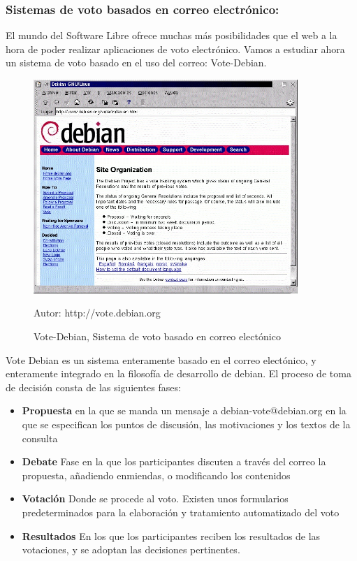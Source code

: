 \subsubsection*{Sistemas de voto basados en correo electrónico:}
El mundo del Software Libre ofrece muchas más posibilidades que el web a la hora de poder realizar aplicaciones de voto electrónico. Vamos a estudiar ahora un sistema de voto basado en el uso del correo: Vote-Debian.

\begin{figure}[H]
\centering
\includegraphics[width=10cm]{Figuras/debian.jpg}
\caption{Vote-Debian, Sistema de voto basado en correo electónico}
Autor:  http://vote.debian.org
\end{figure}

Vote Debian es un sistema enteramente basado en el correo electónico, y enteramente integrado en la filosofía de desarrollo de debian. El proceso de toma de decisión consta de las siguientes fases:

\begin{itemize}
\item \textbf{Propuesta }en la que se manda un mensaje a debian-vote@debian.org en la que se especifican los puntos de discusión, las motivaciones y los textos de la consulta
\item \textbf{Debate} Fase en la que los participantes discuten a través del correo la propuesta, añadiendo enmiendas, o modificando los contenidos
\item \textbf{Votación} Donde se procede al voto. Existen unos formularios predeterminados para la elaboración y tratamiento automatizado del voto
\item \textbf{Resultados} En los que los participantes reciben los resultados de las votaciones, y se adoptan las decisiones pertinentes.

\end{itemize}

